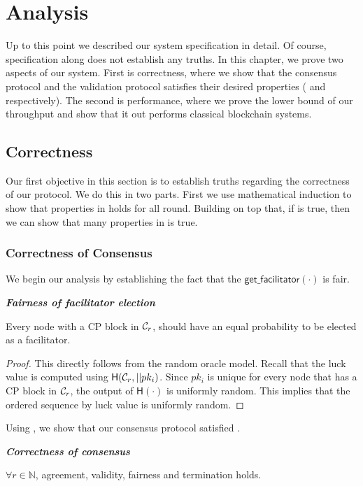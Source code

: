\chapter{Analysis}
\label{ch:analysis}

Up to this point we described our system specification in detail.
Of course, specification along does not establish any truths.
In this chapter, we prove two aspects of our system.
First is correctness,
where we show that the consensus protocol and the validation protocol satisfies their desired properties
( and  respectively).
The second is performance,
where we prove the lower bound of our throughput and show that it out performs classical blockchain systems.

\section{Correctness}
Our first objective in this section is to establish truths regarding the correctness of our protocol.
We do this in two parts.
First we use mathematical induction to show that properties in  holds for all round.
Building on top that, if  is true, then we can show that many properties in  is true.


\subsection{Correctness of Consensus}

We begin our analysis by establishing the fact that the $\textsf{get\_facilitator}(\cdot)$ is fair.
\begin{lemma}
\label{lemma:fairness}
\textbf{\emph{Fairness of facilitator election}}

Every node with a CP block in $\mathcal{C}_r$, should have an equal probability to be elected as a facilitator.
\end{lemma}
\begin{proof}
This directly follows from the random oracle model.
Recall that the luck value is computed using $\textsf{H}(\mathcal{C}_r, || pk_i)$.
Since $pk_i$ is unique for every node that has a CP block in $\mathcal{C}_r$, the output of $\textsf{H}(\cdot)$ is uniformly random.
This implies that the ordered sequence by luck value is uniformly random.
\end{proof}


Using , we show that our consensus protocol satisfied .
\begin{lemma}
\label{lemma:consensus}
\textbf{\emph{Correctness of consensus}}

$\forall r \in \mathbb{N}$, agreement, validity, fairness and termination holds.
\end{lemma}


